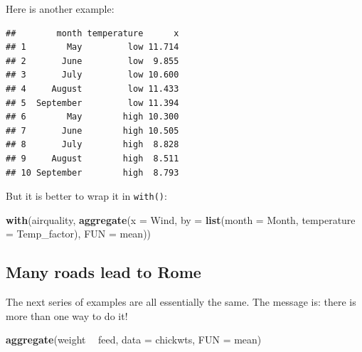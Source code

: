 \documentclass[]{book}
\newenvironment{Shaded}{\begin{snugshade}}{\end{snugshade}}
\newcommand{\DataTypeTok}[1]{\textcolor[rgb]{0.13,0.29,0.53}{#1}}
\newcommand{\KeywordTok}[1]{\textcolor[rgb]{0.13,0.29,0.53}{\textbf{#1}}}
\newcommand{\NormalTok}[1]{#1}
\newcommand{\OperatorTok}[1]{\textcolor[rgb]{0.81,0.36,0.00}{\textbf{#1}}}
\newcommand{\StringTok}[1]{\textcolor[rgb]{0.31,0.60,0.02}{#1}}
\begin{document}
Here is another example:

\begin{Shaded}
\end{Shaded}

\begin{verbatim}
##        month temperature      x
## 1        May         low 11.714
## 2       June         low  9.855
## 3       July         low 10.600
## 4     August         low 11.433
## 5  September         low 11.394
## 6        May        high 10.300
## 7       June        high 10.505
## 8       July        high  8.828
## 9     August        high  8.511
## 10 September        high  8.793
\end{verbatim}

But it is better to wrap it in \texttt{with()}:

\begin{Shaded}
\begin{Highlighting}[]
\KeywordTok{with}\NormalTok{(airquality, }\KeywordTok{aggregate}\NormalTok{(}\DataTypeTok{x =}\NormalTok{ Wind, }
                           \DataTypeTok{by =} \KeywordTok{list}\NormalTok{(}\DataTypeTok{month =}\NormalTok{ Month, }\DataTypeTok{temperature =}\NormalTok{ Temp_factor), }
                           \DataTypeTok{FUN =}\NormalTok{ mean))}
\end{Highlighting}
\end{Shaded}

\hypertarget{many-roads-lead-to-rome}{%
\subsection{Many roads lead to Rome}\label{many-roads-lead-to-rome}}

The next series of examples are all essentially the same. The message is: there is more than one way to do it!

\begin{Shaded}
\begin{Highlighting}[]
\KeywordTok{aggregate}\NormalTok{(weight }\OperatorTok{~}\StringTok{ }\NormalTok{feed, }\DataTypeTok{data =}\NormalTok{ chickwts, }\DataTypeTok{FUN =}\NormalTok{ mean)}
\end{Highlighting}
\end{Shaded}
\end{document}
